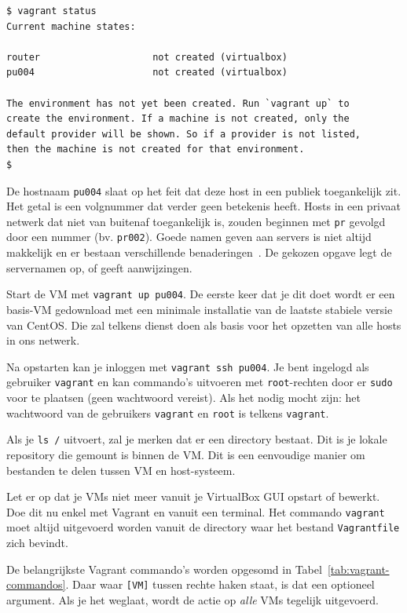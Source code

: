 \begin{verbatim}
$ vagrant status
Current machine states:

router                    not created (virtualbox)
pu004                     not created (virtualbox)

The environment has not yet been created. Run `vagrant up` to
create the environment. If a machine is not created, only the
default provider will be shown. So if a provider is not listed,
then the machine is not created for that environment.
$
\end{verbatim}

De hostnaam \texttt{pu004} slaat op het feit dat deze host in een publiek toegankelijk zit. Het getal is een volgnummer dat verder geen betekenis heeft. Hosts in een privaat netwerk dat niet van buitenaf toegankelijk is, zouden beginnen met \texttt{pr} gevolgd door een nummer (bv. \texttt{pr002}). Goede namen geven aan servers is niet altijd makkelijk en er bestaan verschillende benaderingen~\autocite{Mytton2015,mnxio}. De gekozen opgave legt de servernamen op, of geeft aanwijzingen.

Start de VM met \texttt{vagrant\ up\ pu004}. De eerste keer dat je dit doet wordt er een basis-VM gedownload met een minimale installatie van de laatste stabiele versie van CentOS. Die zal telkens dienst doen als basis voor het opzetten van alle hosts in ons netwerk.

Na opstarten kan je inloggen met \texttt{vagrant\ ssh\ pu004}. Je bent ingelogd als gebruiker \texttt{vagrant} en kan commando's uitvoeren met \texttt{root}-rechten door er \texttt{sudo} voor te plaatsen (geen wachtwoord vereist). Als het nodig mocht zijn: het wachtwoord van de gebruikers \texttt{vagrant} en \texttt{root} is telkens \texttt{vagrant}.

Als je \texttt{ls\ /} uitvoert, zal je merken dat er een directory  bestaat. Dit is je lokale repository die gemount is binnen de VM. Dit is een eenvoudige manier om bestanden te delen tussen VM en host-systeem.

Let er op dat je VMs niet meer vanuit je VirtualBox GUI opstart of bewerkt. Doe dit nu enkel met Vagrant en vanuit een terminal. Het commando \texttt{vagrant} moet altijd uitgevoerd worden vanuit de directory waar het bestand \texttt{Vagrantfile} zich bevindt.

De belangrijkste Vagrant commando's worden opgesomd in Tabel~\ref{tab:vagrant-commandos}. Daar waar \texttt{[VM]} tussen rechte haken staat, is dat een optioneel argument. Als je het weglaat, wordt de actie op \emph{alle} VMs tegelijk uitgevoerd.

